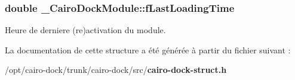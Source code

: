 \subsubsection{\setlength{\rightskip}{0pt plus 5cm}double {\bf \_\-CairoDockModule::fLastLoadingTime}}\label{struct__CairoDockModule_63f924f4ee8c5918d408b53fe94c0b35}


Heure de derniere (re)activation du module. 



La documentation de cette structure a été générée à partir du fichier suivant :\begin{CompactItemize}
\item 
/opt/cairo-dock/trunk/cairo-dock/src/{\bf cairo-dock-struct.h}\end{CompactItemize}
